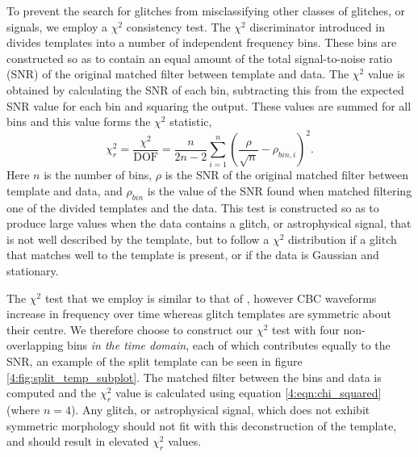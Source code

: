 To prevent the search for \scl{} glitches from misclassifying other classes of glitches, or \gw{} signals, we employ a $\chi^2$ consistency test. The $\chi^2$ discriminator introduced in \cite{Allen_Chi:2005} divides \gw{} templates into a number of independent frequency bins. These bins are constructed so as to contain an equal amount of the total signal-to-noise ratio (SNR) of the original matched filter between template and data. The $\chi^{2}$ value is obtained by calculating the SNR of each bin, subtracting this from the expected SNR value for each bin and squaring the output. These values are summed for all bins and this value forms the $\chi^{2}$ statistic,
%
\begin{equation}
  \chi_{r}^{2} = \frac{\chi^{2}}{\textrm{DOF}} = \frac{n}{2n - 2} \sum_{i=1}^n \left(\frac{\rho}{\sqrt{n}} - \rho_{bin,i}\right)^2.
  \label{4:eqn:chi_squared}
\end{equation}
%
Here $n$ is the number of bins, $\rho$ is the SNR of the original matched filter between template and data, and $\rho_{bin}$ is the value of the SNR found when matched filtering one of the divided templates and the data. This test is constructed so as to produce large values when the data contains a glitch, or astrophysical signal, that is not well described by the template, but to follow a $\chi^2$ distribution if a glitch that matches well to the template is present, or if the data is Gaussian and stationary.

The $\chi^2$ test that we employ is similar to that of \cite{Allen_Chi:2005}, however CBC waveforms increase in frequency over time whereas \scl{} glitch templates are symmetric about their centre. We therefore choose to construct our $\chi^2$ test with four non-overlapping bins \emph{in the time domain}, each of which contributes equally to the SNR, an example of the split template can be seen in figure \ref{4:fig:split_temp_subplot}. The matched filter between the bins and data is computed and the $\chi_{r}^{2}$ value is calculated using equation \ref{4:eqn:chi_squared} (where $n=4$). Any glitch, or astrophysical signal, which does not exhibit symmetric morphology should not fit with this deconstruction of the template, and should result in elevated $\chi_{r}^{2}$ values.

